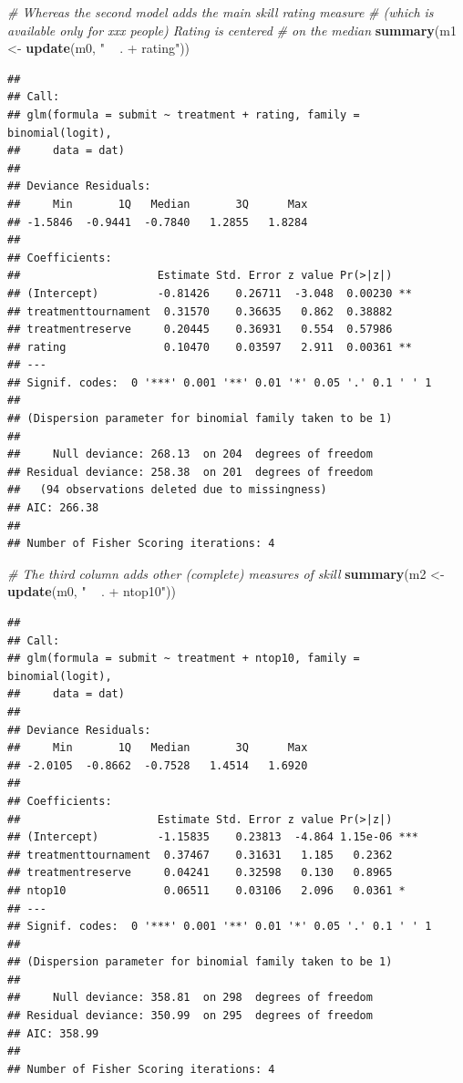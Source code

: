 \documentclass[]{article}
\newenvironment{Shaded}{\begin{snugshade}}{\end{snugshade}}
\newcommand{\KeywordTok}[1]{\textcolor[rgb]{0.13,0.29,0.53}{\textbf{#1}}}
\newcommand{\StringTok}[1]{\textcolor[rgb]{0.31,0.60,0.02}{#1}}
\newcommand{\CommentTok}[1]{\textcolor[rgb]{0.56,0.35,0.01}{\textit{#1}}}
\newcommand{\NormalTok}[1]{#1}
\let\oldShaded\Shaded
\let\endoldShaded\endShaded
\renewenvironment{Shaded}{\footnotesize\oldShaded}{\endoldShaded}
\begin{document}
\begin{Shaded}
\begin{Highlighting}[]
\CommentTok{# Whereas the second model adds the main skill rating measure}
\CommentTok{# (which is available only for xxx people) Rating is centered}
\CommentTok{# on the median}
\KeywordTok{summary}\NormalTok{(m1 <-}\StringTok{ }\KeywordTok{update}\NormalTok{(m0, }\StringTok{" ~ . + rating"}\NormalTok{))}
\end{Highlighting}
\end{Shaded}

\begin{verbatim}
## 
## Call:
## glm(formula = submit ~ treatment + rating, family = binomial(logit), 
##     data = dat)
## 
## Deviance Residuals: 
##     Min       1Q   Median       3Q      Max  
## -1.5846  -0.9441  -0.7840   1.2855   1.8284  
## 
## Coefficients:
##                     Estimate Std. Error z value Pr(>|z|)   
## (Intercept)         -0.81426    0.26711  -3.048  0.00230 **
## treatmenttournament  0.31570    0.36635   0.862  0.38882   
## treatmentreserve     0.20445    0.36931   0.554  0.57986   
## rating               0.10470    0.03597   2.911  0.00361 **
## ---
## Signif. codes:  0 '***' 0.001 '**' 0.01 '*' 0.05 '.' 0.1 ' ' 1
## 
## (Dispersion parameter for binomial family taken to be 1)
## 
##     Null deviance: 268.13  on 204  degrees of freedom
## Residual deviance: 258.38  on 201  degrees of freedom
##   (94 observations deleted due to missingness)
## AIC: 266.38
## 
## Number of Fisher Scoring iterations: 4
\end{verbatim}

\begin{Shaded}
\begin{Highlighting}[]
\CommentTok{# The third column adds other (complete) measures of skill}
\KeywordTok{summary}\NormalTok{(m2 <-}\StringTok{ }\KeywordTok{update}\NormalTok{(m0, }\StringTok{" ~ . + ntop10"}\NormalTok{))}
\end{Highlighting}
\end{Shaded}

\begin{verbatim}
## 
## Call:
## glm(formula = submit ~ treatment + ntop10, family = binomial(logit), 
##     data = dat)
## 
## Deviance Residuals: 
##     Min       1Q   Median       3Q      Max  
## -2.0105  -0.8662  -0.7528   1.4514   1.6920  
## 
## Coefficients:
##                     Estimate Std. Error z value Pr(>|z|)    
## (Intercept)         -1.15835    0.23813  -4.864 1.15e-06 ***
## treatmenttournament  0.37467    0.31631   1.185   0.2362    
## treatmentreserve     0.04241    0.32598   0.130   0.8965    
## ntop10               0.06511    0.03106   2.096   0.0361 *  
## ---
## Signif. codes:  0 '***' 0.001 '**' 0.01 '*' 0.05 '.' 0.1 ' ' 1
## 
## (Dispersion parameter for binomial family taken to be 1)
## 
##     Null deviance: 358.81  on 298  degrees of freedom
## Residual deviance: 350.99  on 295  degrees of freedom
## AIC: 358.99
## 
## Number of Fisher Scoring iterations: 4
\end{verbatim}
\end{document}
